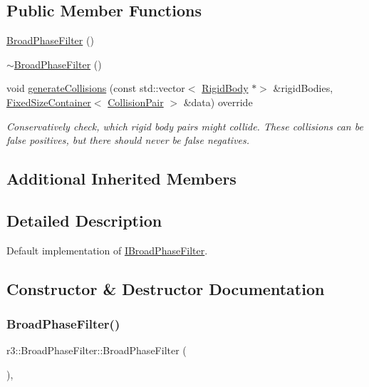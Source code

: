 \subsection*{Public Member Functions}
\begin{DoxyCompactItemize}
\item 
\mbox{\hyperlink{classr3_1_1_broad_phase_filter_afcdb0ed5acb941bf16e284cb0031fe2e}{Broad\+Phase\+Filter}} ()
\item 
\mbox{\hyperlink{classr3_1_1_broad_phase_filter_a3c28ac36ed06766b235efad77ff9fd5d}{$\sim$\+Broad\+Phase\+Filter}} ()
\item 
void \mbox{\hyperlink{classr3_1_1_broad_phase_filter_a0435dc6468401e32bf151f84f52e80f8}{generate\+Collisions}} (const std\+::vector$<$ \mbox{\hyperlink{classr3_1_1_rigid_body}{Rigid\+Body}} $\ast$$>$ \&rigid\+Bodies, \mbox{\hyperlink{classr3_1_1_fixed_size_container}{Fixed\+Size\+Container}}$<$ \mbox{\hyperlink{classr3_1_1_collision_pair}{Collision\+Pair}} $>$ \&data) override
\begin{DoxyCompactList}\small\item\em Conservatively check, which rigid body pairs might collide. These collisions can be false positives, but there should never be false negatives. \end{DoxyCompactList}\end{DoxyCompactItemize}
\subsection*{Additional Inherited Members}


\subsection{Detailed Description}
Default implementation of \mbox{\hyperlink{classr3_1_1_i_broad_phase_filter}{I\+Broad\+Phase\+Filter}}. 

\subsection{Constructor \& Destructor Documentation}
\mbox{\label{classr3_1_1_broad_phase_filter_afcdb0ed5acb941bf16e284cb0031fe2e}} 
\subsubsection{\texorpdfstring{Broad\+Phase\+Filter()}{BroadPhaseFilter()}}
{\footnotesize\ttfamily r3\+::\+Broad\+Phase\+Filter\+::\+Broad\+Phase\+Filter (\begin{DoxyParamCaption}{ }\end{DoxyParamCaption})\hspace{0.3cm}{\ttfamily [explicit]}, {\ttfamily [default]}}

